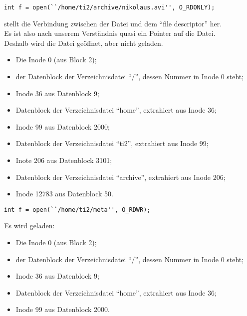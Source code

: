 

\begin{lstlisting}[numbers=none]
int f = open(``/home/ti2/archive/nikolaus.avi'', O_RDONLY);
\end{lstlisting}

 stellt die Verbindung zwischen der Datei  und dem ``file descriptor''  her. \\
Es ist also nach unserem Verständnis quasi ein Pointer auf die Datei.\\ Deshalb wird die Datei geöffnet, aber nicht geladen.

\begin{itemize}
\item Die Inode 0 (aus Block 2);
\item der Datenblock der Verzeichnisdatei ``/'', dessen Nummer in Inode 0 steht;
\item Inode 36 aus Datenblock 9;
\item Datenblock der Verzeichnisdatei ``home'', extrahiert aus Inode 36;
\item Inode 99 aus Datenblock 2000;
\item Datenblock der Verzeichnisdatei ``ti2'', extrahiert aus Inode 99;
\item Inote 206 aus Datenblock 3101;
\item Datenblock der Verzeichnisdatei ``archive'', extrahiert aus Inode 206;
\item Inode 12783 aus Datenblock 50.
\end{itemize}


\begin{lstlisting}[numbers=none]
int f = open(``/home/ti2/meta'', O_RDWR);
\end{lstlisting}

Es wird geladen:

\begin{itemize}
\item Die Inode 0 (aus Block 2);
\item der Datenblock der Verzeichnisdatei ``/'', dessen Nummer in Inode 0 steht;
\item Inode 36 aus Datenblock 9;
\item Datenblock der Verzeichnisdatei ``home'', extrahiert aus Inode 36;
\item Inode 99 aus Datenblock 2000.

\end{itemize}


